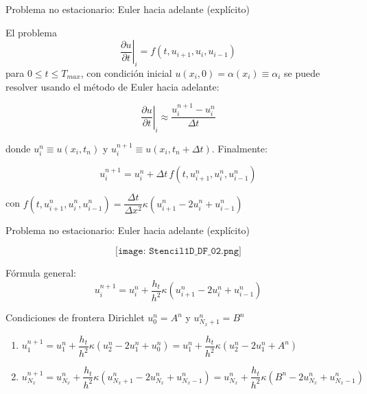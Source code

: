 \documentclass[handout]{beamer}
\begin{document}
\begin{frame}{Problema no estacionario: Euler hacia adelante (expl\'icito)}

El problema
\[
\left.\frac{\partial u}{\partial t}\right|_i = f(t, u_{i+1}, u_{i}, u_{i-1})
\]
para $0 \leq t \leq T_{max}$, con condici\'on inicial $u(x_i, 0) = \alpha(x_i) \equiv \alpha_i$ \pause se puede resolver usando el m\'etodo de Euler hacia adelante:

\[
\left.\frac{\partial u}{\partial t}\right|_i  \approx \frac{u_{i}^{n+1} - u_{i}^{n}}{\Delta t}
\]

donde $u_{i}^{n} \equiv u(x_i, t_n)$ y $u_{i}^{n+1} \equiv u(x_i, t_n + \Delta t)$. \pause Finalmente:

\[
u_{i}^{n+1} = u_{i}^{n} + \Delta t \, f(t, u_{i+1}^{n}, u_{i}^{n}, u_{i-1}^{n}) 
\]

con $f(t, u_{i+1}^{n}, u_{i}^{n}, u_{i-1}^{n}) = \dfrac{\Delta t}{\Delta x^2} \kappa (u_{i+1}^{n} - 2 u_{i}^{n} + u_{i-1}^{n}) $

\end{frame}

\begin{frame}{Problema no estacionario: Euler hacia adelante (expl\'icito)}
	
	$$\texttt{[image: Stencil1D\_DF\_02.png]}$$
	
	\begin{small}
		
		F\'ormula general:
		\begin{displaymath}
		u_{i}^{n+1} = u_{i}^{n} + \frac{h_t}{h^2} \kappa \left(u_{i+1}^{n} - 2 u_{i}^{n} + u_{i-1}^{n}\right)
		\end{displaymath}	
		
		
		Condiciones de frontera Dirichlet $u_{0}^{n} = A^{n}$ y $u_{N_x+1}^{n} = B^{n}$
	\end{small}
		\begin{enumerate}[<+->]
			\item {\footnotesize $u_{1}^{n+1} = u_{1}^{n} + \dfrac{h_t}{h^2} \kappa \left(u_{2}^{n} - 2 u_{1}^{n} + u_{0}^{n}\right) = u_{1}^{n} + \dfrac{h_t}{h^2} \kappa \left(u_{2}^{n} - 2 u_{1}^{n} + \boxed{A^{n}}\right)$}
			\item {\footnotesize $u_{N_x}^{n+1} = u_{N_x}^{n} + \dfrac{h_t}{h^2} \kappa \left(u_{N_x+1}^{n} - 2 u_{N_x}^{n} + u_{N_x-1}^{n}\right) = u_{N_x}^{n} + \dfrac{h_t}{h^2} \kappa \left(\boxed{B^{n}} - 2 u_{N_x}^{n} +  u_{N_x-1}^{n} \right)$}
		\end{enumerate}
		

\end{frame}
\end{document}
